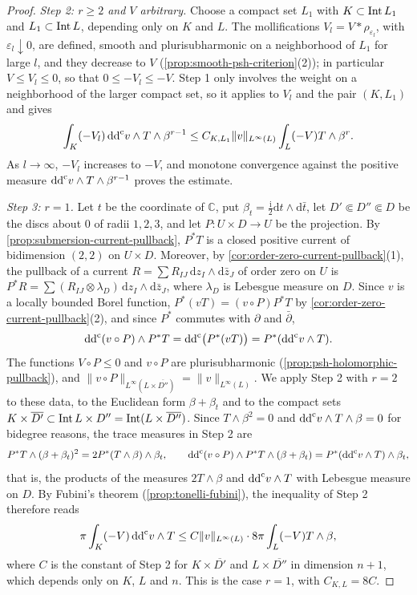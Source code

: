 \begin{proof}
\emph{Step 2: $r\geq2$ and $V$ arbitrary.} Choose a compact set $L_1$ with $K\subset\operatorname{Int} L_1$ and $L_1\subset\operatorname{Int} L$, depending only on $K$ and $L$. The mollifications $V_l=V*\rho_{\varepsilon_l}$, with $\varepsilon_l\downarrow0$, are defined, smooth and plurisubharmonic on a neighborhood of $L_1$ for large $l$, and they decrease to $V$ (\cref{prop:smooth-psh-criterion}(2)); in particular $V\leq V_l\leq0$, so that $0\leq-V_l\leq-V$. Step 1 only involves the weight on a neighborhood of the larger compact set, so it applies to $V_l$ and the pair $(K,L_1)$ and gives
\[
 \int_K(-V_l)\,\mathrm{dd}^{\mathrm{c}} v\wedge T\wedge\beta^{r-1}\leq C_{K,L_1}\|v\|_{L^\infty(L)}\int_L(-V)T\wedge\beta^r .
\]
As $l\to\infty$, $-V_l$ increases to $-V$, and monotone convergence against the positive measure $\mathrm{dd}^{\mathrm{c}} v\wedge T\wedge\beta^{r-1}$ proves the estimate.

\emph{Step 3: $r=1$.} Let $t$ be the coordinate of $\mathbb C$, put $\beta_t=\frac{\mathrm i}{2}\mathrm dt\wedge\mathrm d\bar t$, let $D'\Subset D''\Subset D$ be the discs about $0$ of radii $1,2,3$, and let $P\colon U\times D\to U$ be the projection. By \cref{prop:submersion-current-pullback}, $P^*T$ is a closed positive current of bidimension $(2,2)$ on $U\times D$. Moreover, by \cref{cor:order-zero-current-pullback}(1), the pullback of a current $R=\sum R_{IJ}\,\mathrm dz_I\wedge\mathrm d\bar z_J$ of order zero on $U$ is $P^*R=\sum(R_{IJ}\otimes\lambda_D)\,\mathrm dz_I\wedge\mathrm d\bar z_J$, where $\lambda_D$ is Lebesgue measure on $D$. Since $v$ is a locally bounded Borel function, $P^*(vT)=(v\circ P)P^*T$ by \cref{cor:order-zero-current-pullback}(2), and since $P^*$ commutes with $\partial$ and $\bar\partial$,
\[
 \mathrm{dd}^{\mathrm{c}}(v\circ P)\wedge P^*T=\mathrm{dd}^{\mathrm{c}}\bigl(P^*(vT)\bigr)=P^*(\mathrm{dd}^{\mathrm{c}} v\wedge T).
\]
The functions $V\circ P\leq0$ and $v\circ P$ are plurisubharmonic (\cref{prop:psh-holomorphic-pullback}), and $\|v\circ P\|_{L^\infty(L\times\overline{D''})}=\|v\|_{L^\infty(L)}$. We apply Step 2 with $r=2$ to these data, to the Euclidean form $\beta+\beta_t$ and to the compact sets $K\times\overline{D'}\subset\operatorname{Int} L\times D''=\operatorname{Int}(L\times\overline{D''})$. Since $T\wedge\beta^2=0$ and $\mathrm{dd}^{\mathrm{c}} v\wedge T\wedge\beta=0$ for bidegree reasons, the trace measures in Step 2 are
\[
 P^*T\wedge(\beta+\beta_t)^2=2P^*(T\wedge\beta)\wedge\beta_t,
 \qquad
 \mathrm{dd}^{\mathrm{c}}(v\circ P)\wedge P^*T\wedge(\beta+\beta_t)=P^*(\mathrm{dd}^{\mathrm{c}} v\wedge T)\wedge\beta_t,
\]
that is, the products of the measures $2T\wedge\beta$ and $\mathrm{dd}^{\mathrm{c}} v\wedge T$ with Lebesgue measure on $D$. By Fubini's theorem (\cref{prop:tonelli-fubini}), the inequality of Step 2 therefore reads
\[
 \pi\int_K(-V)\,\mathrm{dd}^{\mathrm{c}} v\wedge T\leq C\|v\|_{L^\infty(L)}\cdot8\pi\int_L(-V)T\wedge\beta,
\]
where $C$ is the constant of Step 2 for $K\times\overline{D'}$ and $L\times\overline{D''}$ in dimension $n+1$, which depends only on $K$, $L$ and $n$. This is the case $r=1$, with $C_{K,L}=8C$.
\end{proof}

